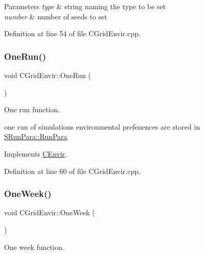 \begin{DoxyParams}{Parameters}
{\em type} & string naming the type to be set \\
\hline
{\em number} & number of seeds to set \\
\hline
\end{DoxyParams}


Definition at line 54 of file C\+Grid\+Envir.\+cpp.

\mbox{\label{class_c_grid_envir_ab44b39db400c6fae4cfa623546f7fe4a}} 
\subsubsection{\texorpdfstring{OneRun()}{OneRun()}}
{\footnotesize\ttfamily void C\+Grid\+Envir\+::\+One\+Run (\begin{DoxyParamCaption}{ }\end{DoxyParamCaption})\hspace{0.3cm}{\ttfamily [virtual]}}



One run function. 

one run of simulations environmental prefenences are stored in \mbox{\hyperlink{struct_s_run_para_a3e7797ad861d93d0d7dd6ce23ff259b7}{S\+Run\+Para\+::\+Run\+Para}} 

Implements \mbox{\hyperlink{class_c_envir_a36cbe82b70ac3bd8741bc6baf0baac84}{C\+Envir}}.



Definition at line 60 of file C\+Grid\+Envir.\+cpp.

\mbox{\label{class_c_grid_envir_a5c5cde58adbcee3ec3fd54c734228bf6}} 
\subsubsection{\texorpdfstring{OneWeek()}{OneWeek()}}
{\footnotesize\ttfamily void C\+Grid\+Envir\+::\+One\+Week (\begin{DoxyParamCaption}{ }\end{DoxyParamCaption})\hspace{0.3cm}{\ttfamily [virtual]}}



One week function. 

